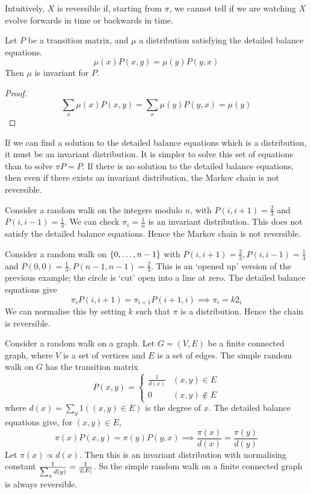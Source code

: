 \begin{remark}
	Intuitively, \( X \) is reversible if, starting from \( \pi \), we cannot tell if we are watching \( X \) evolve forwards in time or backwards in time.
\end{remark}
\begin{lemma}
	Let \( P \) be a transition matrix, and \( \mu \) a distribution satisfying the detailed balance equations.
	\[
		\mu(x) P(x,y) = \mu(y) P(y,x)
	\]
	Then \( \mu \) is invariant for \( P \).
\end{lemma}
\begin{proof}
	\[
		\sum_x \mu(x) P(x,y) = \sum_x \mu(y) P(y,x) = \mu(y)
	\]
\end{proof}
\begin{remark}
	If we can find a solution to the detailed balance equations which is a distribution, it must be an invariant distribution.
	It is simpler to solve this set of equations than to solve \( \pi P = P \).
	If there is no solution to the detailed balance equations, then even if there exists an invariant distribution, the Markov chain is not reversible.
\end{remark}
\begin{example}
	Consider a random walk on the integers modulo \( n \), with \( P(i, i+1) = \frac{2}{3} \) and \( P(i, i-1) = \frac{1}{3} \).
	We can check \( \pi_i = \frac{1}{n} \) is an invariant distribution.
	This does not satisfy the detailed balance equations.
	Hence the Markov chain is not reversible.
\end{example}
\begin{example}
	Consider a random walk on \( \qty{0, \dots, n-1} \) with \( P(i, i+1) = \frac{2}{3}, P(i, i-1) = \frac{1}{3} \) and \( P(0,0) = \frac{1}{3}, P(n-1, n-1) = \frac{2}{3} \).
	This is an `opened up' version of the previous example; the circle is `cut' open into a line at zero.
	The detailed balance equations give
	\[
		\pi_i P(i, i+1) = \pi_{i+1} P(i+1, i) \implies \pi_i = k 2_i
	\]
	We can normalise this by setting \( k \) such that \( \pi \) is a distribution.
	Hence the chain is reversible.
\end{example}
\begin{example}
	Consider a random walk on a graph.
	Let \( G = (V, E) \) be a finite connected graph, where \( V \) is a set of vertices and \( E \) is a set of edges.
	The simple random walk on \( G \) has the transition matrix
	\[
		P(x,y) = \begin{cases}
			\frac{1}{d(x)} & (x,y) \in E     \\
			0              & (x,y) \not\in E
		\end{cases}
	\]
	where \( d(x) = \sum_y 1((x,y) \in E) \) is the degree of \( x \).
	The detailed balance equations give, for \( (x,y) \in E \),
	\[
		\pi(x) P(x,y) = \pi(y) P(y,x) \implies \frac{\pi(x)}{d(x)} = \frac{\pi(y)}{d(y)}
	\]
	Let \( \pi(x) \propto d(x) \).
	Then this is an invariant distribution with normalising constant \( \frac{1}{\sum_y d(y)} = \frac{1}{2\abs{E}} \).
	So the simple random walk on a finite connected graph is always reversible.
\end{example}
